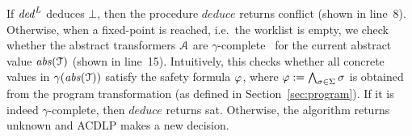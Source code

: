 If $\mathit{ded}^{\mathit{L}}$ deduces $\bot$, then 
the procedure $\mathit{deduce}$ returns \textsf{conflict} (shown in line~8).
Otherwise, when a fixed-point is reached, i.e.~the worklist is empty, we check whether
the abstract transformers $\mathcal{A}$ are $\gamma$-complete~\cite{dhk2013-popl} for the current abstract value $\mathit{abs}(\mathcal{T})$ 
(shown in line~15).
%
Intuitively, this checks whether all concrete values in 
$\gamma(\mathit{abs}(\mathcal{T}))$ satisfy the safety formula $\varphi$, where 
$\varphi:= \bigwedge_{\sigma\in\Sigma} \sigma$ is obtained 
from the program transformation (as defined in Section~\ref{sec:program}).
%
If it is indeed 
$\gamma$-complete, then $\mathit{deduce}$ returns \textsf{sat}.  Otherwise, the 
algorithm returns \textsf{unknown} and ACDLP makes a new decision.    

